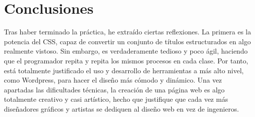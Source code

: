 \section{Conclusiones}

Tras haber terminado la práctica, he extraído ciertas reflexiones. La primera es la potencia del CSS, capaz de convertir un conjunto de títulos estructurados en algo realmente vistoso. Sin embargo, es verdaderamente tedioso y poco ágil, haciendo que el programador repita y repita los mismos procesos en cada clase. Por tanto, está totalmente justificado el uso y desarrollo de herramientas a más alto nivel, como Wordpress, para hacer el diseño más cómodo y dinámico. Una vez apartadas las dificultades técnicas, la creación de una página web es algo totalmente creativo y casi artístico, hecho que justifique que cada vez más diseñadores gráficos y artistas se dediquen al diseño web en vez de ingenieros.


\newpage




	

